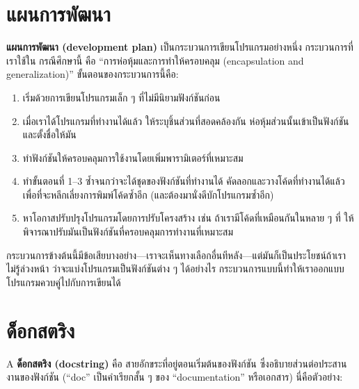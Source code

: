 \section{แผนการพัฒนา} %

{\bf แผนการพัฒนา (development plan)} เป็นกระบวนการเขียนโปรแกรมอย่างหนึ่ง กระบวนการที่เราใช้ใน
กรณีศึกษานี้ คือ ``การห่อหุ้มและการทำให้ครอบคลุม (encapsulation and generalization)'' 
ขั้นตอนของกระบวนการนี้คือ:

\begin{enumerate}

\item เริ่มด้วยการเขียนโปรแกรมเล็ก ๆ ที่ไม่มีนิยามฟังก์ชันก่อน

\item เมื่อเราได้โปรแกรมที่ทำงานได้แล้ว ให้ระบุชิ้นส่วนที่สอดคล้องกัน ห่อหุ้มส่วนนั้นเข้าเป็นฟังก์ชันและตั้งชื่อให้มัน

\item ทำฟังก์ชันให้ครอบคลุมการใช้งานโดยเพิ่มพารามิเตอร์ที่เหมาะสม

\item ทำขั้นตอนที่ 1--3 ซ้ำจนกว่าจะได้ชุดของฟังก์ชันที่ทำงานได้ 
คัดลอกและวางโค้ดที่ทำงานได้แล้ว เพื่อที่จะหลีกเลี่ยงการพิมพ์โค้ดซ้ำอีก (และต้องมานั่งดีบักโปรแกรมซ้ำอีก)

\item หาโอกาสปรับปรุงโปรแกรมโดยการปรับโครงสร้าง เช่น ถ้าเรามีโค้ดที่เหมือนกันในหลาย ๆ ที่
ให้พิจารณาปรับมันเป็นฟังก์ชันที่ครอบคลุมการทำงานที่เหมาะสม

\end{enumerate}

กระบวนการข้างต้นนี้มีข้อเสียบางอย่าง---เราจะเห็นทางเลือกอื่นทีหลัง---แต่มันก็เป็นประโยชน์ถ้าเราไม่รู้ล่วงหน้า
ว่าจะแบ่งโปรแกรมเป็นฟังก์ชันต่าง ๆ ได้อย่างไร กระบวนการแบบนี้ทำให้เราออกแบบโปรแกรมควบคู่ไปกับการเขียนได้


\section{ด็อกสตริง } %
\label{docstring}

A {\bf ด็อกสตริง (docstring)} คือ สายอักขระที่อยู่ตอนเริ่มต้นของฟังก์ชัน ซึ่งอธิบายส่วนต่อประสานงานของฟังก์ชัน
(``doc'' เป็นคำเรียกสั้น ๆ ของ ``documentation'' หรือเอกสาร) นี่คือตัวอย่าง:

